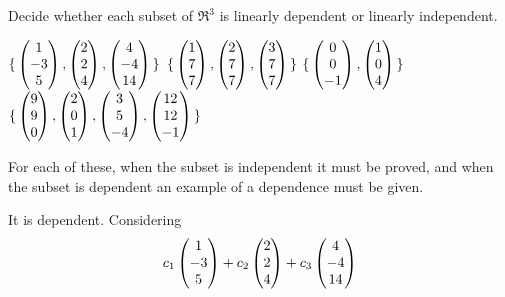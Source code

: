 \begin{exercises}
  \recommended \item
    Decide whether each subset of \( \Re^3 \) is linearly dependent or
    linearly independent. 
    \begin{exparts}
      \partsitem \( \mbox{$\{\,\begin{pmatrix} 1 \\ -3 \\ 5 \end{pmatrix},
                    \begin{pmatrix} 2 \\ 2 \\ 4 \end{pmatrix},
                    \begin{pmatrix} 4 \\ -4 \\ 14 \end{pmatrix} \,\}$}  \)
      \partsitem \( \mbox{$\{\,\begin{pmatrix} 1 \\ 7 \\ 7 \end{pmatrix},
                    \begin{pmatrix} 2 \\ 7 \\ 7 \end{pmatrix},
                    \begin{pmatrix} 3 \\ 7 \\ 7 \end{pmatrix} \,\}$}  \)
      \partsitem \( \mbox{$\{\,\begin{pmatrix} 0 \\ 0 \\ -1 \end{pmatrix},
                    \begin{pmatrix} 1 \\ 0 \\ 4 \end{pmatrix} \,\}$}  \)
      \partsitem \( \mbox{$\{\,\begin{pmatrix} 9 \\ 9 \\ 0 \end{pmatrix},
                    \begin{pmatrix} 2 \\ 0 \\ 1 \end{pmatrix},
                    \begin{pmatrix} 3 \\ 5 \\ -4 \end{pmatrix},
                    \begin{pmatrix} 12 \\ 12 \\ -1 \end{pmatrix} \,\}$}  \)
    \end{exparts}
    \begin{answer}
      For each of these, when the subset is independent it must be proved, and
      when the subset is dependent an example of a dependence must be given.
      \begin{exparts}
        \partsitem It is dependent.
          Considering
          \begin{equation*}
             c_1\colvec{1 \\ -3 \\ 5}
             +c_2\colvec{2 \\ 2 \\ 4}
             +c_3\colvec{4 \\ -4 \\ 14}

\end{equation*}
\end{exparts}
\end{answer}
\end{exercises}
